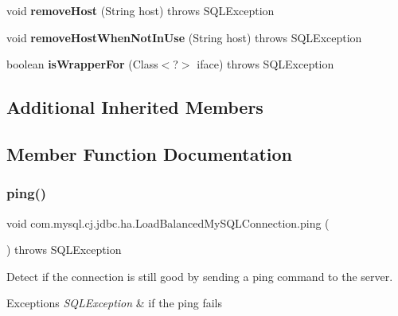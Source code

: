 \begin{DoxyCompactItemize}
void {\bfseries remove\+Host} (String host)  throws S\+Q\+L\+Exception 
\item 
\mbox{\label{classcom_1_1mysql_1_1cj_1_1jdbc_1_1ha_1_1_load_balanced_my_s_q_l_connection_ad127c1ba70ff4bdba22ad3c70cd1ecff}} 
void {\bfseries remove\+Host\+When\+Not\+In\+Use} (String host)  throws S\+Q\+L\+Exception 
\item 
\mbox{\label{classcom_1_1mysql_1_1cj_1_1jdbc_1_1ha_1_1_load_balanced_my_s_q_l_connection_a0a4d5ec928636709cb6aac4fd6f3c435}} 
boolean {\bfseries is\+Wrapper\+For} (Class$<$?$>$ iface)  throws S\+Q\+L\+Exception 
\end{DoxyCompactItemize}
\subsection*{Additional Inherited Members}


\subsection{Member Function Documentation}
\mbox{\label{classcom_1_1mysql_1_1cj_1_1jdbc_1_1ha_1_1_load_balanced_my_s_q_l_connection_a58a06fe0caa8144988fb2464d9fc4b0a}} 
\subsubsection{\texorpdfstring{ping()}{ping()}}
{\footnotesize\ttfamily void com.\+mysql.\+cj.\+jdbc.\+ha.\+Load\+Balanced\+My\+S\+Q\+L\+Connection.\+ping (\begin{DoxyParamCaption}{ }\end{DoxyParamCaption}) throws S\+Q\+L\+Exception}

Detect if the connection is still good by sending a ping command to the server.


\begin{DoxyExceptions}{Exceptions}
{\em S\+Q\+L\+Exception} & if the ping fails \\
\hline
\end{DoxyExceptions}


